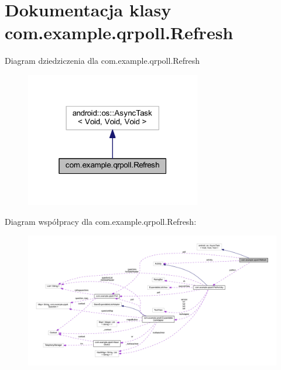 \hypertarget{classcom_1_1example_1_1qrpoll_1_1_refresh}{\section{Dokumentacja klasy com.\+example.\+qrpoll.\+Refresh}
\label{classcom_1_1example_1_1qrpoll_1_1_refresh}
}


Diagram dziedziczenia dla com.\+example.\+qrpoll.\+Refresh\nopagebreak
\begin{figure}[H]
\begin{center}
\leavevmode
\includegraphics[width=217pt]{classcom_1_1example_1_1qrpoll_1_1_refresh__inherit__graph}
\end{center}
\end{figure}


Diagram współpracy dla com.\+example.\+qrpoll.\+Refresh\+:
\nopagebreak
\begin{figure}[H]
\begin{center}
\leavevmode
\includegraphics[width=350pt]{classcom_1_1example_1_1qrpoll_1_1_refresh__coll__graph}
\end{center}
\end{figure}
